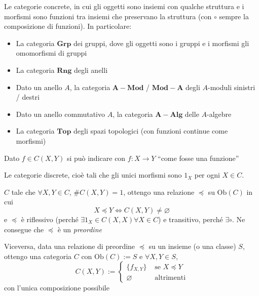 \begin{example}{}
    Le categorie concrete, in cui gli oggetti sono insiemi con qualche struttura
    e i morfismi sono funzioni tra insiemi che preservano la struttura (con \(\circ\) sempre la composizione di funzioni). In particolare:
\begin{itemize}
    \item La categoria \(\mathbf{Grp}\) dei gruppi, dove gli oggetti sono i
        gruppi e i morfismi gli omomorfismi di gruppi
    \item La categoria \(\mathbf{Rng}\) degli anelli
    \item Dato un anello \(A\), la categoria \(\mathbf{A-Mod}\) / \(\mathbf{Mod-A}\) degli \(A\)-moduli sinistri / destri
    \item Dato un anello commutativo \(A\), la categoria \(\mathbf{A-Alg}\)
        delle \(A\)-algebre
    \item La categoria \(\mathbf{Top}\) degli spazi topologici (con funzioni
        continue come morfismi)
\end{itemize}
\end{example}
\begin{note}{}
    Dato \(f \in C{(X, Y)}\) si può indicare con \(f : X \to Y\) ``come fosse
    una funzione''
\end{note}

\begin{example}{}
    Le categorie discrete, cioè tali che gli unici morfismi sono \(1_X\) per
    ogni \(X \in C\).
\end{example}

\begin{example}{}
    \(C\) tale che \(\forall X, Y \in C\), \(\# C {(X, Y)} = 1\), ottengo
    una relazione \(\preccurlyeq \) su \(\mathrm{Ob}{(C)}\) in cui
    \[
      X \preccurlyeq Y \iff C{(X, Y)} \neq \varnothing
    \]
    e \(\preccurlyeq\)  è riflessivo (perché \(\exists  1_X \in C{(X, X)} \forall X \in C\)) e transitivo, perché \(\exists \circ\). Ne consegue che \(\preccurlyeq\) è un \emph{preordine}

    Viceversa, data una relazione di preordine \(\preccurlyeq\) su un insieme (o
    una classe) \(S\), ottengo una categoria \(C\) con \(\mathrm{Ob}{(C)} := S\) e \(\forall X, Y \in S\), 
    \[
      C{(X, Y)} := \begin{cases}{}
          \{f_{X,Y} \} & \text{ se } X \preccurlyeq Y \\
          \varnothing & \text{ altrimenti}
      \end{cases}
    \]
    con l'unica composizione possibile
\end{example}

